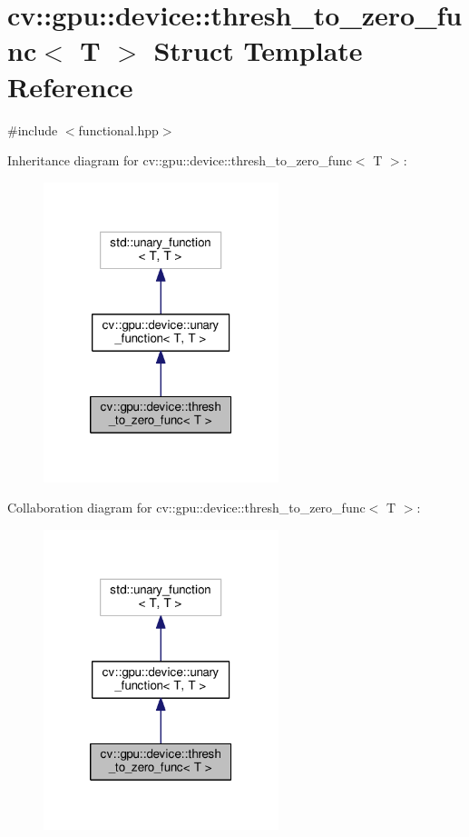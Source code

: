 \hypertarget{structcv_1_1gpu_1_1device_1_1thresh__to__zero__func}{\section{cv\-:\-:gpu\-:\-:device\-:\-:thresh\-\_\-to\-\_\-zero\-\_\-func$<$ T $>$ Struct Template Reference}
\label{structcv_1_1gpu_1_1device_1_1thresh__to__zero__func}
}


{\ttfamily \#include $<$functional.\-hpp$>$}



Inheritance diagram for cv\-:\-:gpu\-:\-:device\-:\-:thresh\-\_\-to\-\_\-zero\-\_\-func$<$ T $>$\-:\nopagebreak
\begin{figure}[H]
\begin{center}
\leavevmode
\includegraphics[width=194pt]{structcv_1_1gpu_1_1device_1_1thresh__to__zero__func__inherit__graph}
\end{center}
\end{figure}


Collaboration diagram for cv\-:\-:gpu\-:\-:device\-:\-:thresh\-\_\-to\-\_\-zero\-\_\-func$<$ T $>$\-:\nopagebreak
\begin{figure}[H]
\begin{center}
\leavevmode
\includegraphics[width=194pt]{structcv_1_1gpu_1_1device_1_1thresh__to__zero__func__coll__graph}
\end{center}
\end{figure}
